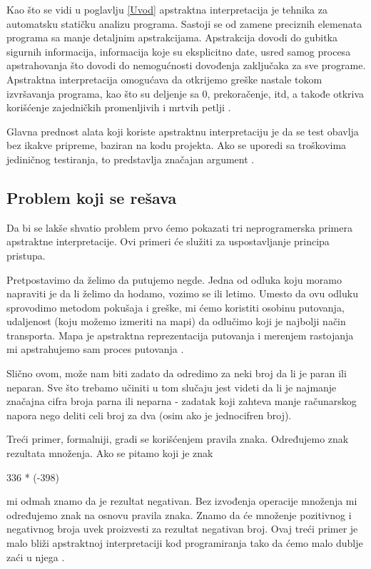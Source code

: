 
Kao što se vidi u poglavlju \ref{Uvod} apstraktna interpretacija je tehnika za automatsku statičku analizu programa. Sastoji se od zamene preciznih elemenata programa sa manje detaljnim apstrakcijama. Apstrakcija dovodi do gubitka sigurnih informacija, informacija koje su eksplicitno date, usred samog procesa apstrahovanja što dovodi do nemogućnosti dovođenja zaključaka za sve programe. Apstraktna interpretacija omogućava da otkrijemo greške nastale tokom izvršavanja programa, kao što su deljenje sa 0, prekoračenje, itd, a takođe otkriva korišćenje zajedničkih promenljivih i mrtvih petlji \cite{AbramskyHankin}. 

Glavna prednost alata koji koriste apstraktnu interpretaciju je da se test obavlja bez ikakve pripreme, baziran na kodu projekta. Ako se uporedi sa troškovima jediničnog testiranja, to predstavlja značajan argument \cite{AbramskyHankin}. 


\subsection{Problem koji se rešava}
\label{subsec:problem1}
Da bi se lakše shvatio problem prvo ćemo pokazati tri neprogramerska primera apstraktne interpretacije. Ovi primeri će služiti za uspostavljanje principa pristupa. 

Pretpostavimo da želimo da putujemo negde. Jedna od odluka koju moramo napraviti je da li želimo da hodamo, vozimo se ili letimo. Umesto da ovu odluku sprovodimo metodom pokušaja i greške, mi ćemo koristiti osobinu putovanja, udaljenost (koju možemo izmeriti na mapi) da odlučimo koji je najbolji način transporta. Mapa je apstraktna reprezentacija putovanja i merenjem rastojanja mi apstrahujemo sam proces putovanja \cite{AbramskyHankin}. 

Slično ovom, može nam biti zadato da odredimo za neki broj da li je paran ili neparan. Sve što trebamo učiniti u tom slučaju jest videti da li je najmanje značajna cifra broja parna ili neparna - zadatak koji
zahteva manje računarskog napora nego deliti celi broj za dva (osim ako je jednocifren broj). 


Treći primer, formalniji, gradi se korišćenjem pravila znaka. Određujemo znak rezultata množenja. Ako se pitamo koji je znak

336 * (-398)  

mi odmah znamo da je rezultat negativan. Bez izvođenja operacije množenja mi određujemo znak na osnovu pravila znaka. Znamo da će množenje pozitivnog i negativnog broja uvek proizvesti za rezultat negativan broj. Ovaj treći primer je malo bliži apstraktnoj interpretaciji kod programiranja tako da ćemo malo dublje zaći u njega \cite{AbramskyHankin}. 

